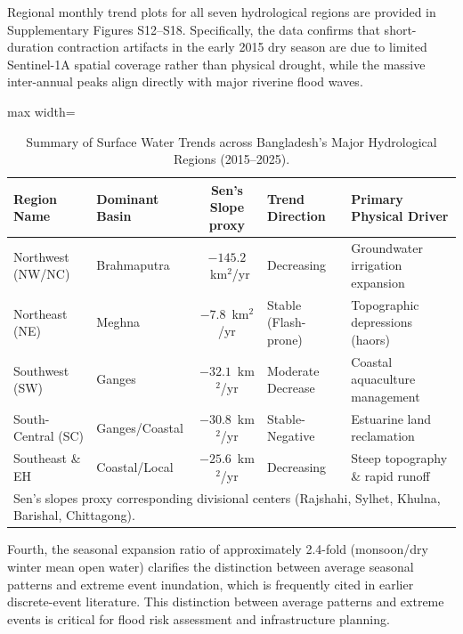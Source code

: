 \documentclass[fleqn,10pt,twocolumn]{article}
\begin{document}
Regional monthly trend plots for all seven hydrological regions are provided in Supplementary Figures S12--S18. Specifically, the data confirms that short-duration contraction artifacts in the early 2015 dry season are due to limited Sentinel-1A spatial coverage rather than physical drought, while the massive inter-annual peaks align directly with major riverine flood waves.

\begin{table}[htbp]
\centering
\caption{Summary of Surface Water Trends across Bangladesh's Major Hydrological Regions (2015--2025).}
\label{tab:regional_trends_summary}
\begin{adjustbox}{max width=\linewidth}\begin{tabular}{llcll}
\toprule
\textbf{Region Name} & \textbf{Dominant Basin} & \textbf{Sen's Slope proxy} & \textbf{Trend Direction} & \textbf{Primary Physical Driver} \\
\midrule
Northwest (NW/NC) & Brahmaputra & $-145.2$~km$^2$/yr & Decreasing & Groundwater irrigation expansion \\
Northeast (NE) & Meghna & $-7.8$~km$^2$/yr & Stable (Flash-prone) & Topographic depressions (haors) \\
Southwest (SW) & Ganges & $-32.1$~km$^2$/yr & Moderate Decrease & Coastal aquaculture management \\
South-Central (SC) & Ganges/Coastal & $-30.8$~km$^2$/yr & Stable-Negative & Estuarine land reclamation \\
Southeast \& EH & Coastal/Local & $-25.6$~km$^2$/yr & Decreasing & Steep topography \& rapid runoff \\
\bottomrule
\multicolumn{5}{l}{\footnotesize Sen's slopes proxy corresponding divisional centers (Rajshahi, Sylhet, Khulna, Barishal, Chittagong).}
\end{tabular}\end{adjustbox}
\end{table}

Fourth, the seasonal expansion ratio of approximately 2.4-fold (monsoon/dry winter mean open water) clarifies the distinction between average seasonal patterns and extreme event inundation, which is frequently cited in earlier discrete-event literature. This distinction between average patterns and extreme events is critical for flood risk assessment and infrastructure planning.
\end{document}
